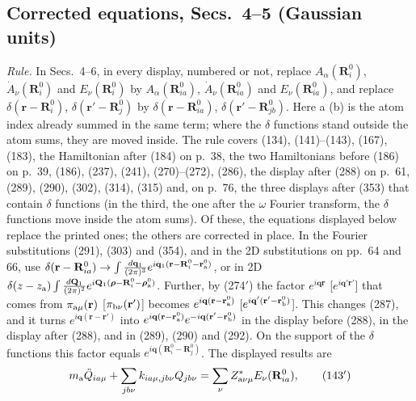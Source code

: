 \documentclass[11pt]{article}
\begin{document}
\subsection{Corrected equations, Secs.~4--5 (Gaussian units)}\label{sec:phase-45}
\emph{Rule.} In Secs.~4--6, in every display, numbered or not, replace $A_\alpha(\mathbf R^0_i)$,
$\dot A_\nu(\mathbf R^0_i)$ and $E_\nu(\mathbf R^0_i)$ by $A_\alpha(\mathbf R^0_{ia})$, $\dot A_\nu(\mathbf R^0_{ia})$ and
$E_\nu(\mathbf R^0_{ia})$, and replace $\delta(\mathbf r-\mathbf R^0_i)$, $\delta(\mathbf r'-\mathbf R^0_j)$ by
$\delta(\mathbf r-\mathbf R^0_{ia})$, $\delta(\mathbf r'-\mathbf R^0_{jb})$. Here a (b) is the atom index already
summed in the same term; where the $\delta$ functions stand outside the atom sums, they are moved inside.
The rule covers (134), (141)--(143), (167), (183), the Hamiltonian after (184) on p.~38, the two
Hamiltonians before (186) on p.~39, (186), (237), (241), (270)--(272), (286), the display after (288) on
p.~61, (289), (290), (302), (314), (315) and, on p.~76, the three displays after (353) that contain
$\delta$ functions (in the third, the one after the $\omega$ Fourier transform, the $\delta$ functions move
inside the atom sums). Of these, the equations displayed below replace the printed ones; the others are
corrected in place. In the Fourier substitutions (291), (303) and (354), and in the 2D substitutions on
pp.~64 and 66, use
$\delta(\mathbf r-\mathbf R^0_{ia})\to\int\frac{d\mathbf q_1}{(2\pi)^3}e^{i\mathbf q_1(\mathbf r-\mathbf R^0_i-\mathbf r^0_{\rm a})}$,
or in 2D $\delta(z-z_{\rm a})\int\frac{d\mathbf Q_1}{(2\pi)^2}
e^{i\mathbf Q_1(\bm{\rho}-\mathbf R^0_i-\bm{\rho}^0_{\rm a})}$. Further, by (274$'$) the factor
$e^{i\mathbf q\mathbf r}$ [$e^{i\mathbf q'\mathbf r'}$] that comes from $\pi_{{\rm a}\mu}(\mathbf r)$
[$\pi_{{\rm b}\nu}(\mathbf r')$] becomes $e^{i\mathbf q(\mathbf r-\mathbf r^0_{\rm a})}$
[$e^{i\mathbf q'(\mathbf r'-\mathbf r^0_{\rm b})}$]. This changes (287), and it turns
$e^{i\mathbf q(\mathbf r-\mathbf r')}$ into $e^{i\mathbf q(\mathbf r-\mathbf r^0_{\rm a})}
e^{-i\mathbf q(\mathbf r'-\mathbf r^0_{\rm b})}$ in the display before (288), in the display after (288),
and in (289), (290) and (292). On the support of the $\delta$ functions this factor equals
$e^{i\mathbf q(\mathbf R^0_i-\mathbf R^0_j)}$. The displayed results are
\begin{equation*}
m_{\rm a}\ddot Q_{ia\mu}+\sum_{jb\nu}k_{ia\mu,jb\nu}Q_{jb\nu}=\sum_\nu Z^*_{{\rm a}\nu\mu}E_\nu(\mathbf R^0_{ia}),\tag{143$'$}
\end{equation*}
\end{document}
